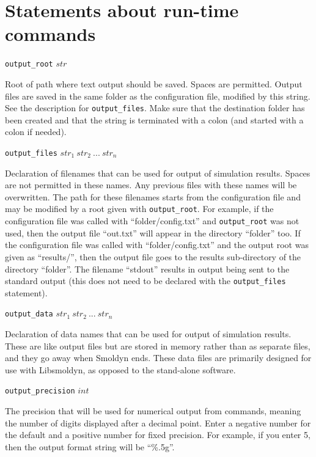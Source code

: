 \documentclass {scrbook}
\newcommand {\ttt} {\texttt}
\begin{document}
\section{Statements about run-time commands}

\begin{description}

\item{\ttt{output\_root} $str$}

Root of path where text output should be saved. Spaces are permitted. Output files are saved in the same folder as the configuration file, modified by this string. See the description for \ttt{output\_files}. Make sure that the destination folder has been created and that the string is terminated with a colon (and started with a colon if needed).

\item{\ttt{output\_files} $str_1\ str_2\ ...\ str_n$}

Declaration of filenames that can be used for output of simulation results. Spaces are not permitted in these names. Any previous files with these names will be overwritten. The path for these filenames starts from the configuration file and may be modified by a root given with \ttt{output\_root}. For example, if the configuration file was called with ``folder/config.txt'' and \ttt{output\_root} was not used, then the output file ``out.txt'' will appear in the directory ``folder'' too. If the configuration file was called with ``folder/config.txt'' and the output root was given as ``results/'', then the output file goes to the results sub-directory of the directory ``folder''. The filename ``stdout'' results in output being sent to the standard output (this does not need to be declared with the \ttt{output\_files} statement).

\item{\ttt{output\_data} $str_1\ str_2\ ...\ str_n$}

Declaration of data names that can be used for output of simulation results. These are like output files but are stored in memory rather than as separate files, and they go away when Smoldyn ends. These data files are primarily designed for use with Libsmoldyn, as opposed to the stand-alone software.

\item{\ttt{output\_precision} $int$}

The precision that will be used for numerical output from commands, meaning the number of digits displayed after a decimal point. Enter a negative number for the default and a positive number for fixed precision. For example, if you enter 5, then the output format string will be ``\%.5g''.


\end{description}
\end{document}
